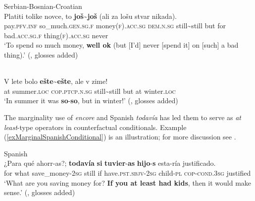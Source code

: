 \begin{exe}
	\ex\label{exMarginalExtensionsJosJos}
	Serbian-Bosnian-Croatian\\
	\gll Platiti tolike novce, to \textbf{još}\sim\textbf{još} (ali za lošu stvar nikada).\\
	pay.\textsc{pfv}.\textsc{inf} so\_much.\textsc{gen}.\textsc{sg}.\textsc{f} money(\textsc{f}).\textsc{acc}.\textsc{sg} \textsc{dem}.\textsc{n}.\textsc{sg} still\sim still \phantom{(}but for bad.\textsc{acc}.\textsc{sg}.\textsc{f} thing(\textsc{f}).\textsc{acc}.\textsc{sg} never\\
	\glt \lq To spend so much money, \textbf{well ok}  (but [I'd] never [spend it] on [such] a bad thing).\rq{ }(\cite[s.v. \textit{još}]{HJP}, glosses added)

	\ex {}\label{exMarginalExtensionsSlovak}\\
	\gll V lete bolo \textbf{ešte}\sim\textbf{ešte}, ale v zime!\\
	at summer.\textsc{loc} \textsc{cop}.\textsc{ptcp}.\textsc{n}.\textsc{sg} still\sim still but at winter.\textsc{loc}\\
	\glt \lq In summer it was \textbf{so}-\textbf{so}, but in winter!' (\cite[s.v. \textit{ešte}]{SSSJ}, glosses added)
\end{exe}

The marginality use of  \textit{encore} and Spanish \textit{todavía} has led them to serve as \textit{at least}-type  operators in counterfactual conditionals.  Example (\ref{exMarginalSpanishConditional}) is an illustration; for more discussion see .

\begin{exe}
	\ex Spanish\label{exMarginalSpanishConditional}\\
	\gll ¿Para qué ahorr-as?; \textbf{todavía} \textbf{si} \textbf{tuvier}-\textbf{as} \textbf{hijo}-\textbf{s} esta-ría justificado.\\
	\phantom{¿}for what save\_money-2\textsc{sg} still if have.\textsc{pst}.\textsc{sbjv}-2\textsc{sg} child-\textsc{pl} \textsc{cop}-\textsc{cond}.3\textsc{sg} justified\\
	\glt \lq What are you saving money for? \textbf{If you at least had kids}, then it would make sense.' (\cite[s.v. \textit{todavía}]{RAEDictionary}, glosses added)
\end{exe}

